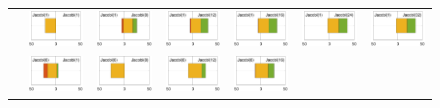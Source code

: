 \begin{landscape}
\begin{figure}
\begin{center}
{\begin{tabular}{c|cccccc}
&
 \includegraphics[width=.135\columnwidth]{plots/Jacobi(1)_vs_Jacobi(1).pdf}
&
\includegraphics[width=.135\columnwidth]{plots/Jacobi(1)_vs_Jacobi(8).pdf}
&
\includegraphics[width=.135\columnwidth]{plots/Jacobi(1)_vs_Jacobi(12).pdf}
&
\includegraphics[width=.135\columnwidth]{plots/Jacobi(1)_vs_Jacobi(16).pdf}
&
\includegraphics[width=.135\columnwidth]{plots/Jacobi(1)_vs_Jacobi(24).pdf}
&
\includegraphics[width=.135\columnwidth]{plots/Jacobi(1)_vs_Jacobi(32).pdf}
\\
&
\includegraphics[width=.135\columnwidth]{plots/Jacobi(8)_vs_Jacobi(1).pdf}
&
\includegraphics[width=.135\columnwidth]{plots/Jacobi(8)_vs_Jacobi(8).pdf}
&
\includegraphics[width=.135\columnwidth]{plots/Jacobi(8)_vs_Jacobi(12).pdf}
&
\includegraphics[width=.135\columnwidth]{plots/Jacobi(8)_vs_Jacobi(16).pdf}

\end{tabular}}
\end{center}
\end{figure}
\end{landscape}
